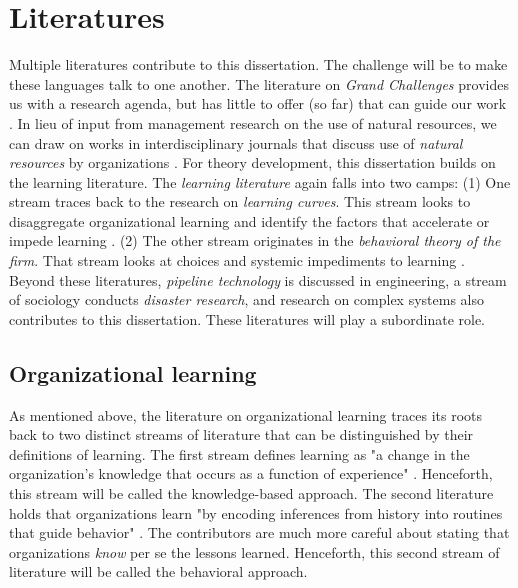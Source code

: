 \section{Literatures}

Multiple literatures contribute to this dissertation. The challenge will be to make these languages talk to one another. The literature on \textit{Grand Challenges} provides us with a research agenda, but has little to offer (so far) that can guide our work \citep{George2015}. In lieu of input from management research on the use of natural resources, we can draw on works in interdisciplinary journals that discuss use of \textit{natural resources} by organizations \citep[e.g., ][]{Rockstrom2009}. For theory development, this dissertation builds on the learning literature. The \textit{learning literature} again falls into two camps: (1) One stream traces back to the research on \textit{learning curves}. This stream looks to disaggregate organizational learning and identify the factors that accelerate or impede learning \citep{Argote2013}. (2) The other stream originates in the \textit{behavioral theory of the firm}. That stream looks at choices and systemic impediments to learning \citep[e.g., ][]{March1963, Levitt1988, Levinthal1993}. Beyond these literatures, \textit{pipeline technology} is discussed in engineering, a stream of sociology conducts \textit{disaster research}, and research on complex systems \citep[especially][]{Perrow1984} also contributes to this dissertation. These literatures will play a subordinate role.

\subsection{Organizational learning}

As mentioned above, the literature on organizational learning traces its roots back to two distinct streams of literature that can be distinguished by their definitions of learning. The first stream defines learning as "a change in the organization's knowledge that occurs as a function of experience" \citep[p. 1124]{Argote2011}. Henceforth, this stream will be called the knowledge-based approach. The second literature holds that organizations learn "by encoding inferences from history into routines that guide behavior" \citep[p. 320]{Levitt1988}. The contributors are much more careful about stating that organizations \textit{know} per se the lessons learned. Henceforth, this second stream of literature will be called the behavioral approach.

